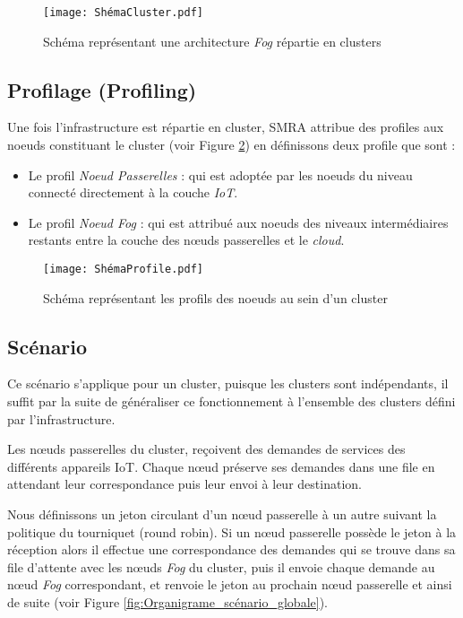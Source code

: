 \begin{figure}[H]
    \centering
    \texttt{[image: ShémaCluster.pdf]}
    \caption{Schéma représentant une architecture \emph{Fog} répartie en clusters}
    \label{fig:Infrastructure_fog_repartie_en_cluster}
\end{figure}


\subsection{Profilage (Profiling)}
Une fois l'infrastructure est répartie en cluster, SMRA attribue des profiles aux noeuds constituant le cluster (voir Figure \ref{fig:profilage}) en définissons deux profile que sont :
\begin{itemize}
  \item Le profil \emph{Noeud Passerelles} : qui est adoptée par les noeuds du niveau connecté directement à la couche \emph{IoT}.
  \item Le profil \emph{Noeud Fog} : qui est attribué aux noeuds des niveaux intermédiaires restants entre la couche des nœuds passerelles et le \emph{cloud}. 
\end{itemize}


\begin{figure}[H]
  \centering
  \texttt{[image: ShémaProfile.pdf]}
  \caption{Schéma représentant les profils des noeuds au sein d'un cluster}
  \label{fig:profilage}
\end{figure}


\subsection{Scénario}
Ce scénario s'applique pour un cluster, puisque les clusters sont indépendants, il suffit par la suite de généraliser ce fonctionnement à l'ensemble des clusters défini par l'infrastructure.\par
Les nœuds passerelles du cluster, reçoivent des demandes de services des différents appareils IoT. Chaque nœud préserve ses demandes dans une file en attendant leur correspondance puis leur envoi à leur destination.\par
Nous définissons un jeton circulant d'un nœud passerelle à un autre suivant la politique du tourniquet (round robin). Si un nœud passerelle possède le jeton à la réception alors il effectue une correspondance des demandes qui se trouve dans sa file d'attente avec les nœuds \emph{Fog} du cluster, puis il envoie chaque demande au nœud \emph{Fog} correspondant, et  renvoie le jeton au prochain nœud passerelle et ainsi de suite (voir Figure \ref{fig:Organigrame_scénario_globale}).


